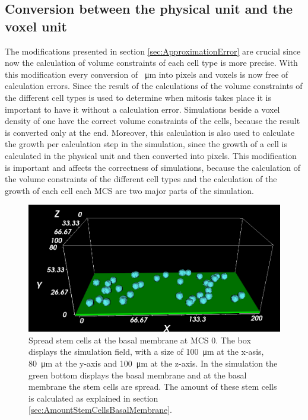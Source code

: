 \subsection{Conversion between the physical unit and the voxel unit}
The modifications presented in section \ref{sec:ApproximationError} are crucial since now the calculation of volume constraints of each cell type is more precise. With this modification every conversion of \SI{}{\micro\metre} into pixels and voxels is now free of calculation errors. Since the result of the calculations of the volume constraints of the different cell types is used to determine when mitosis takes place it is important to have it without a calculation error. Simulations beside a voxel density of one have the correct volume constraints of the cells, because the result is converted only at the end. Moreover, this calculation is also used to calculate the growth per calculation step in the simulation, since the growth of a cell is calculated in the physical unit and then converted into pixels. This modification is important and affects the correctness of simulations, because the calculation of the volume constraints of the different cell types and the calculation of the growth of each cell each \ac{MCS} are two major parts of the simulation.\newline
\newpage
\begin{figure}[h]
	\center
	\includegraphics[scale=0.4]{figures/SimulationAtMCS0.png}
	\caption[Spread stem cells at the basal membrane at \ac{MCS} 0]{Spread stem cells at the basal membrane at \ac{MCS} 0. The box displays the simulation field, with a size of \SI{100}{\micro\metre} at the x-asis, \SI{80}{\micro\metre} at the y-axis and \SI{100}{\micro\metre} at the z-axis. In the simulation the green bottom displays the basal membrane and at the basal membrane the stem cells are spread. The amount of these stem cells is calculated as explained in section \ref{sec:AmountStemCellsBasalMembrane}.}
	\label{img:SimulationAtMCS0}
\end{figure}




